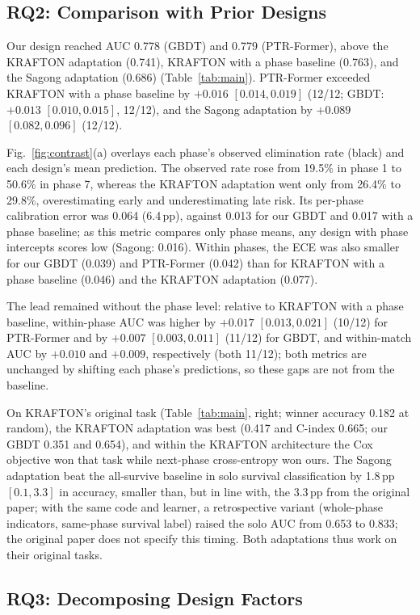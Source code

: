 \documentclass[conference]{IEEEtran}
\begin{document}
\subsection{RQ2: Comparison with Prior Designs}
\label{sec:results:rq2}
Our design reached AUC 0.778 (GBDT) and 0.779 (PTR-Former), above the KRAFTON adaptation (0.741), KRAFTON with a phase baseline (0.763), and the Sagong adaptation (0.686) (Table~\ref{tab:main}).
PTR-Former exceeded KRAFTON with a phase baseline by $+0.016$ $[0.014, 0.019]$ (12/12; GBDT: $+0.013$ $[0.010, 0.015]$, 12/12), and the Sagong adaptation by $+0.089$ $[0.082, 0.096]$ (12/12).

Fig.~\ref{fig:contrast}(a) overlays each phase's observed elimination rate (black) and each design's mean prediction.
The observed rate rose from 19.5\% in phase 1 to 50.6\% in phase 7, whereas the KRAFTON adaptation went only from 26.4\% to 29.8\%, overestimating early and underestimating late risk.
Its per-phase calibration error was 0.064 (6.4\,pp), against 0.013 for our GBDT and 0.017 with a phase baseline; as this metric compares only phase means, any design with phase intercepts scores low (Sagong: 0.016).
Within phases, the ECE was also smaller for our GBDT (0.039) and PTR-Former (0.042) than for KRAFTON with a phase baseline (0.046) and the KRAFTON adaptation (0.077).

The lead remained without the phase level: relative to KRAFTON with a phase baseline, within-phase AUC was higher by $+0.017$ $[0.013, 0.021]$ (10/12) for PTR-Former and by $+0.007$ $[0.003, 0.011]$ (11/12) for GBDT, and within-match AUC by $+0.010$ and $+0.009$, respectively (both 11/12); both metrics are unchanged by shifting each phase's predictions, so these gaps are not from the baseline.

On KRAFTON's original task (Table~\ref{tab:main}, right; winner accuracy 0.182 at random), the KRAFTON adaptation was best (0.417 and C-index 0.665; our GBDT 0.351 and 0.654), and within the KRAFTON architecture the Cox objective won that task while next-phase cross-entropy won ours.
The Sagong adaptation beat the all-survive baseline in solo survival classification by 1.8\,pp $[0.1, 3.3]$ in accuracy, smaller than, but in line with, the 3.3\,pp from the original paper; with the same code and learner, a retrospective variant (whole-phase indicators, same-phase survival label) raised the solo AUC from 0.653 to 0.833; the original paper does not specify this timing.
Both adaptations thus work on their original tasks.

\subsection{RQ3: Decomposing Design Factors}
\label{sec:results:rq3}
\end{document}
